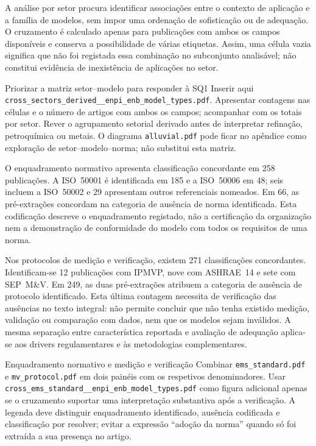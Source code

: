 A análise por setor procura identificar associações entre o contexto
de aplicação e a família de modelos, sem impor uma ordenação de
sofisticação ou de adequação. O cruzamento é calculado apenas para
publicações com ambos os campos disponíveis e conserva a possibilidade
de várias etiquetas. Assim, uma célula vazia significa que não
foi registada essa combinação no subconjunto analisável; não
constitui evidência de inexistência de aplicações no setor.

{Priorizar a matriz setor--modelo para responder à SQ1}
{Inserir aqui
\nolinkurl{cross_sectors_derived__enpi_enb_model_types.pdf}.
Apresentar contagens nas células e o número de artigos com ambos
os campos; acompanhar com os totais por setor. Rever o agrupamento
setorial derivado antes de interpretar refinação, petroquímica
ou metais. O diagrama \texttt{alluvial.pdf} pode ficar no apêndice
como exploração de setor--modelo--norma; não substitui esta matriz.}%

O enquadramento normativo apresenta classificação concordante em
258 publicações. A ISO~50001 é identificada em 185 e a ISO~50006
em 48; seis incluem a ISO~50002 e 29 apresentam outros referenciais
nomeados. Em 66, as pré-extrações concordam na categoria de ausência
de norma identificada. Esta codificação descreve o enquadramento
registado, não a certificação da organização nem a demonstração
de conformidade do modelo com todos os requisitos de uma norma.

Nos protocolos de medição e verificação, existem 271 classificações
concordantes. Identificam-se 12 publicações com IPMVP, nove com
ASHRAE~14 e sete com SEP~M\&V. Em 249, as duas pré-extrações
atribuem a categoria de ausência de protocolo identificado.
Esta última contagem necessita de verificação das ausências no
texto integral: não permite concluir que não tenha existido
medição, validação ou comparação com dados, nem que os modelos
sejam inválidos. A mesma separação entre característica reportada
e avaliação de adequação aplica-se aos drivers regulamentares
e às metodologias complementares.

{Enquadramento normativo e medição e verificação}
{Combinar \texttt{ems\_standard.pdf} e \texttt{mv\_protocol.pdf}
em dois painéis com os respetivos denominadores. Usar
\nolinkurl{cross_ems_standard__enpi_enb_model_types.pdf}
como figura adicional apenas se o cruzamento suportar uma
interpretação substantiva após a verificação. A legenda deve
distinguir enquadramento identificado, ausência codificada e
classificação por resolver; evitar a expressão ``adoção da norma''
quando só foi extraída a sua presença no artigo.}%

